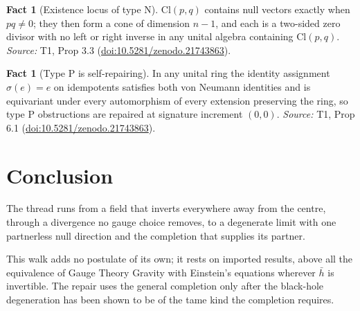 \documentclass[11pt]{article}
\theoremstyle{definition}
\newtheorem{fact}[theorem]{Fact}
\theoremstyle{plain}
\providecommand{\Cl}{}\renewcommand{\Cl}{\mathrm{Cl}}
\providecommand{\hb}{}\renewcommand{\hb}{\bar{h}}
\begin{document}
\begin{fact}[Existence locus of type N]\label{c:transport.existence-locus-type-n}
$\Cl(p,q)$ contains null vectors exactly when $pq \neq 0$; they then form a cone of dimension $n - 1$, and each is a two-sided zero divisor with no left or right inverse in any unital algebra containing $\Cl(p,q)$.
\emph{Source:} T1, Prop 3.3 (\href{https://doi.org/10.5281/zenodo.21743863}{doi:10.5281/zenodo.21743863}).
\end{fact}

\begin{fact}[Type P is self-repairing]\label{c:transport.type-p-self-repairing}
In any unital ring the identity assignment $\sigma(e) = e$ on idempotents satisfies both von Neumann identities and is equivariant under every automorphism of every extension preserving the ring, so type P obstructions are repaired at signature increment $(0,0)$.
\emph{Source:} T1, Prop 6.1 (\href{https://doi.org/10.5281/zenodo.21743863}{doi:10.5281/zenodo.21743863}).
\end{fact}

\section*{Conclusion}
The thread runs from a field that inverts everywhere away from the centre, through a divergence no gauge choice removes, to a degenerate limit with one partnerless null direction and the completion that supplies its partner.

This walk adds no postulate of its own; it rests on imported results, above all the equivalence of Gauge Theory Gravity with Einstein's equations wherever $\hb$ is invertible. The repair uses the general completion only after the black-hole degeneration has been shown to be of the tame kind the completion requires.
\end{document}
